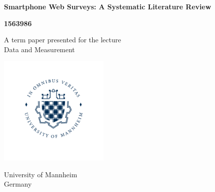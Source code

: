 \documentclass[12pt,a4paper]{article}
\begin{document}
\begin{titlepage}
   \begin{center}
   
       \vspace*{1cm}
       
       \large
       \textbf{Smartphone Web Surveys: A Systematic Literature Review}
        
       \vspace{1.5cm}
   
       \textbf{1563986}
   
       \vfill
   
       A term paper presented for the lecture\\
       Data and Measurement
   
       \vspace{0.8cm}
   
       \includegraphics[width=0.4\textwidth]{reports/figures/university_logo.png}
       
       University of Mannheim\\
       Germany\\
   
       \date{\today}
   
   \end{center}
\end{titlepage}
\end{document}
